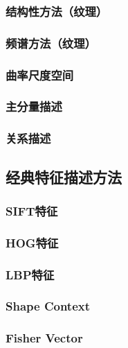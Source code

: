 \subsubsection{结构性方法（纹理）}

\subsubsection{频谱方法（纹理）}

\subsubsection{曲率尺度空间}

\subsubsection{主分量描述}

\subsubsection{关系描述}

\subsection{经典特征描述方法}

\subsubsection{SIFT特征}

\subsubsection{HOG特征}

\subsubsection{LBP特征}

\subsubsection{Shape Context}

\subsubsection{Fisher Vector}



\begin{comment}
\begin{itemize}
\item 基于灰度共生矩阵的方法
\item 灰度-梯度共生矩阵分析法
\item 灰度行程长度统计法
\item 小波分析法
\item 基于Gabor小波变换的纹理分析法
\end{itemize}
\end{comment}